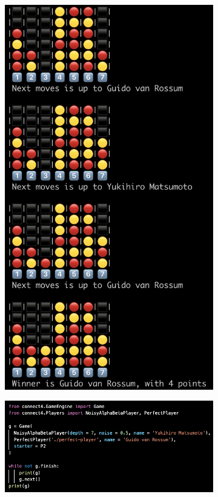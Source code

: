 \documentclass{article}
\begin{document}
\begin{figure}
\begin{subfigure}{0.45\textwidth}
      \includegraphics[width=\linewidth]{img/gameend.png}
      \subcaption{}
    \end{subfigure}
    \medskip
    
    \begin{subfigure}{0.9\textwidth}
      \includegraphics[width=\linewidth]{img/gamecode.png}
      \subcaption{}
    \end{subfigure}
    

\end{figure}
\end{document}

